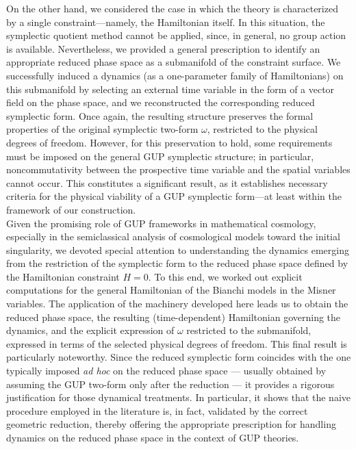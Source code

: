 \documentclass{article}
\numberwithin{equation}{section}
\theoremstyle{definition}
\begin{document}
On the other hand, we considered the case in which the theory is characterized by a single constraint—namely, the Hamiltonian itself. In this situation, the symplectic quotient method cannot be applied, since, in general, no group action is available. Nevertheless, we provided a general prescription to identify an appropriate reduced phase space as a submanifold of the constraint surface. We successfully induced a dynamics (as a one-parameter family of Hamiltonians) on this submanifold by selecting an external time variable in the form of a vector field on the phase space, and we reconstructed the corresponding reduced symplectic form. Once again, the resulting structure preserves the formal properties of the original symplectic two-form $\omega$, restricted to the physical degrees of freedom. However, for this preservation to hold, some requirements must be imposed on the general GUP symplectic structure; in particular, noncommutativity between the prospective time variable and the spatial variables cannot occur. This constitutes a significant result, as it establishes necessary criteria for the physical viability of a GUP symplectic form—at least within the framework of our construction.\\
Given the promising role of GUP frameworks in mathematical cosmology, especially in the semiclassical analysis of cosmological models toward the initial singularity, we devoted special attention to understanding the dynamics emerging from the restriction of the symplectic form to the reduced phase space defined by the Hamiltonian constraint $H=0$. To this end, we worked out explicit computations for the general Hamiltonian of the Bianchi models in the Misner variables. The application of the machinery developed here leads us to obtain the reduced phase space, the resulting (time-dependent) Hamiltonian governing the dynamics, and the explicit expression of $\omega$ restricted to the submanifold, expressed in terms of the selected physical degrees of freedom. This final result is particularly noteworthy. Since the reduced symplectic form coincides with the one typically imposed \emph{ad hoc} on the reduced phase space — usually obtained by assuming the GUP two-form only after the reduction — it provides a rigorous justification for those dynamical treatments. In particular, it shows that the naive procedure employed in the literature is, in fact, validated by the correct geometric reduction, thereby offering the appropriate prescription for handling dynamics on the reduced phase space in the context of GUP theories.
\end{document}
